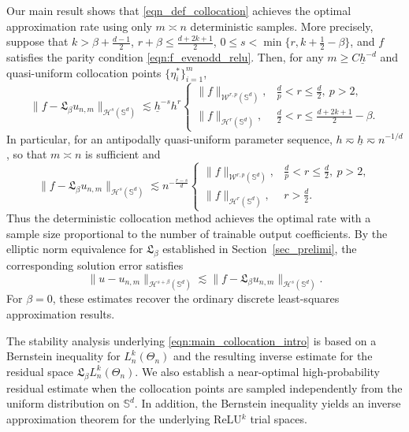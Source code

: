 \documentclass{article}
\numberwithin{equation}{section}
\begin{document}
Our main result shows that \eqref{eqn_def_collocation} achieves the optimal approximation rate using only $m\asymp n$ deterministic samples. More precisely, suppose that $k>\beta+\frac{d-1}{2}$, $r+\beta\leq\frac{d+2k+1}{2}$, $0\leq s<\min\{r,k+\frac12-\beta\}$, and $f$ satisfies the parity condition \eqref{eqn:f_evenodd_relu}. Then, for any $m\geq C\underline h^{-d}$ and quasi-uniform collocation points $\{\eta_i^*\}_{i=1}^m$, 
\begin{equation}\label{eqn:main_collocation_intro}
\|f-\mathfrak L_\beta u_{n,m}\|_{\mathcal H^s(\mathbb S^d)}
\lesssim\underline h^{-s}h^r
\begin{cases}
\|f\|_{\mathcal W^{r,p}(\mathbb S^d)},&\frac{d}{p}<r\leq \frac{d}{2},~p>2,\\
\|f\|_{\mathcal H^r(\mathbb S^d)},&\frac d2<r\leq\frac{d+2k+1}{2}-\beta.
\end{cases}
\end{equation}
In particular, for an antipodally quasi-uniform parameter sequence, $h\eqsim\underline h\eqsim n^{-1/d}$, so that $m\asymp n$ is sufficient and
\begin{equation*}
\|f-\mathfrak L_\beta u_{n,m}\|_{\mathcal H^s(\mathbb S^d)}
\lesssim n^{-\frac{r-s}{d}}
\begin{cases}
\|f\|_{\mathcal W^{r,p}(\mathbb S^d)},&\frac{d}{p}<r\leq \frac{d}{2},~p>2,\\
\|f\|_{\mathcal H^r(\mathbb S^d)},&r>\frac d2.
\end{cases}
\end{equation*}
Thus the deterministic collocation method achieves the optimal rate with a sample size proportional to the number of trainable output coefficients. By the elliptic norm equivalence for $\mathfrak L_\beta$ established in Section~\ref{sec_prelimi}, the corresponding solution error satisfies
\begin{equation*}
\|u-u_{n,m}\|_{\mathcal H^{s+\beta}(\mathbb S^d)}
\lesssim\|f-\mathfrak L_\beta u_{n,m}\|_{\mathcal H^s(\mathbb S^d)}.
\end{equation*}
For $\beta=0$, these estimates recover the ordinary discrete least-squares approximation results.

The stability analysis underlying \eqref{eqn:main_collocation_intro} is based on a Bernstein inequality for $L_n^k(\Theta_n)$ and the resulting inverse estimate for the residual space $\mathfrak L_\beta L_n^k(\Theta_n)$. We also establish a near-optimal high-probability residual estimate when the collocation points are sampled independently from the uniform distribution on $\mathbb S^d$. In addition, the Bernstein inequality yields an inverse approximation theorem for the underlying ReLU$^k$ trial spaces.
\end{document}
